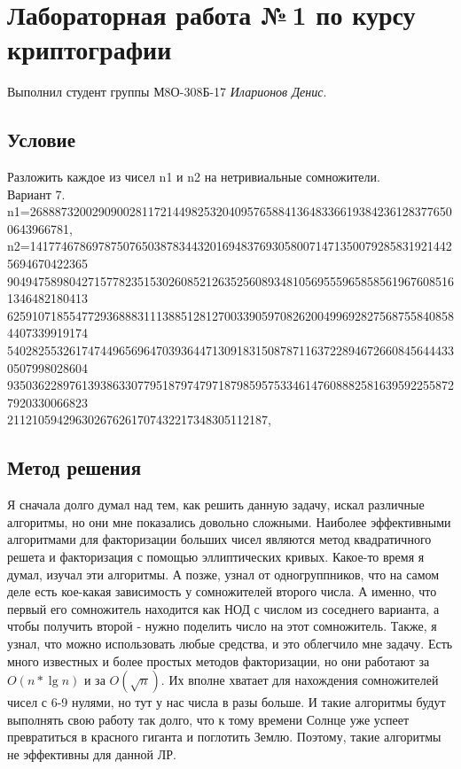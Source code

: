 \documentclass[12pt]{article}
\begin{document}
\section*{Лабораторная работа №\,1 по курсу криптографии}

Выполнил студент группы М8О-308Б-17 \textit{Иларионов Денис}.

\subsection*{Условие}
Разложить каждое из чисел n1 и n2 на нетривиальные сомножители.\\
Вариант 7.\\
n1=268887320029090028117214498253204095765884136483366193842361283776500643966781,\\
n2=141774678697875076503878344320169483769305800714713500792858319214425694670422365\\
9049475898042715778235153026085212635256089348105695559658585619676085161346482180413\\
6259107185547729368883111388512812700339059708262004996928275687558408584407339919174\\
5402825532617474496569647039364471309183150878711637228946726608456444330507998028604\\
9350362289761393863307795187974797187985957533461476088825816395922558727920330066823\\
211210594296302676261707432217348305112187,

\subsection*{Метод решения}

Я сначала долго думал над тем, как решить данную задачу, искал различные алгоритмы, но они мне показались довольно сложными. Наиболее эффективными алгоритмами для факторизации больших чисел являются метод квадратичного решета и факторизация с помощью эллиптических кривых. Какое-то время я думал, изучал эти алгоритмы. А позже, узнал от одногруппников, что на самом деле есть кое-какая зависимость у сомножителей второго числа. А именно, что первый его сомножитель находится как НОД с числом из соседнего варианта, а чтобы получить второй - нужно поделить число на этот сомножитель. Также, я узнал, что можно использовать любые средства, и это облегчило мне задачу. Есть много известных и более простых методов факторизации, но они работают за $ O( n * \lg{n} ) $ и за $ O( \sqrt{n} ) $. Их вполне хватает для нахождения сомножителей чисел с 6-9 нулями, но тут у нас числа в разы больше. И такие алгоритмы будут выполнять свою работу так долго, что к тому времени Солнце уже успеет превратиться в красного гиганта и поглотить Землю. Поэтому, такие алгоритмы не эффективны для данной ЛР.
\end{document}
